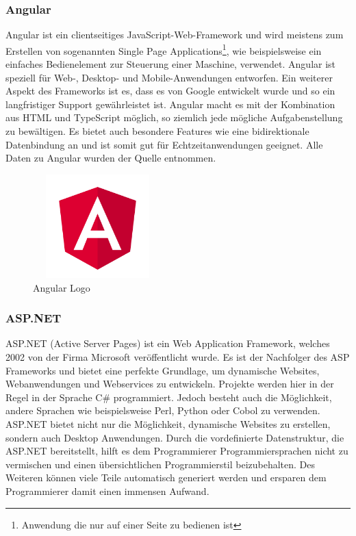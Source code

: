 \subsubsection{Angular}
Angular ist ein clientseitiges JavaScript-Web-Framework und wird meistens zum Erstellen von sogenannten Single Page Applications\footnote{Anwendung die nur auf einer Seite zu bedienen ist}, wie beispielsweise ein einfaches Bedienelement zur Steuerung einer Maschine, verwendet. Angular ist speziell für Web-, Desktop- und Mobile-Anwendungen entworfen. Ein weiterer Aspekt des Frameworks ist es, dass es von Google entwickelt wurde und so ein langfristiger Support gewährleistet ist. Angular macht es mit der Kombination aus HTML und TypeScript möglich, so ziemlich jede mögliche Aufgabenstellung zu bewältigen. Es bietet auch besondere Features wie eine bidirektionale Datenbindung an und ist somit gut für Echtzeitanwendungen geeignet. 
Alle Daten zu Angular wurden der Quelle \cite{Angular} entnommen.
\begin{figure}[h]
	\centering
	\includegraphics[height=4cm,width=5cm]{images/Angular_Logo}
	\caption{Angular Logo}
	\label{fig:Angular Logo}
\end{figure}

\subsubsection{ASP.NET}
ASP.NET (Active Server Pages) ist ein Web Application Framework, welches 2002 von der Firma Microsoft veröffentlicht wurde. Es ist der Nachfolger des ASP Frameworks und bietet eine perfekte Grundlage, um dynamische Websites, Webanwendungen und Webservices zu entwickeln. Projekte werden hier in der Regel in der Sprache C\# programmiert. Jedoch besteht auch die Möglichkeit, andere Sprachen wie beispielsweise Perl, Python oder Cobol zu verwenden. ASP.NET bietet nicht nur die Möglichkeit, dynamische Websites zu erstellen, sondern auch Desktop Anwendungen.
Durch die vordefinierte Datenstruktur, die ASP.NET bereitstellt, hilft es dem Programmierer Programmiersprachen nicht zu vermischen und einen übersichtlichen Programmierstil beizubehalten. Des Weiteren können viele Teile automatisch generiert werden und ersparen dem Programmierer damit einen immensen Aufwand.

